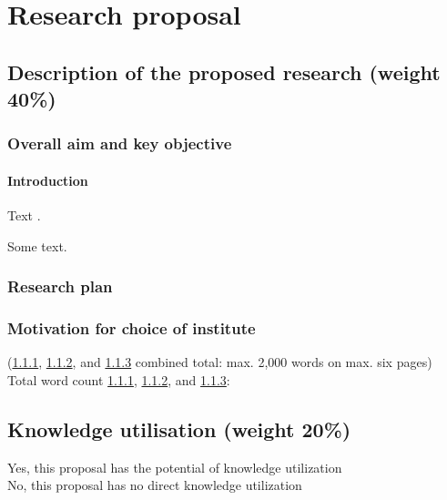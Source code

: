 \section{Research proposal}\label{sec:proposal}

\subsection{Description of the proposed research (weight 40\%)}\label{sec:research}

\subsubsection{Overall aim and key objective}\label{sec:aim}

\paragraph{Introduction}\label{sec:intro}

Text \cite{clarke2018}.

\begin{mdframed}
    Some text.
\end{mdframed}

\subsubsection{Research plan}\label{sec:plan}


\subsubsection{Motivation for choice of institute}\label{sec:institute}


\vfill
\vspace{\baselineskip}
(\ref{sec:aim}, \ref{sec:plan}, and \ref{sec:institute} combined total: max. 2,000 words on max. six pages)\\

Total word count \ref{sec:aim}, \ref{sec:plan}, and \ref{sec:institute}: \\


\newpage
\subsection{Knowledge utilisation (weight 20\%)}\label{sec:KU}
\checkedbox[0pt] Yes, this proposal has the potential of knowledge utilization\\
\checkbox[0pt] No, this proposal has no direct knowledge utilization\\

